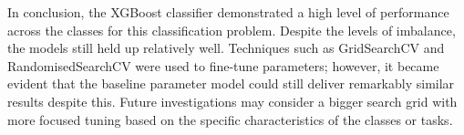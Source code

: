 \medskip
In conclusion, the XGBoost classifier demonstrated a high level of performance across the classes for this classification problem. Despite the levels of imbalance, the models still held up relatively well. Techniques such as GridSearchCV and RandomisedSearchCV were used to fine-tune parameters; however, it became evident that the baseline parameter model could still deliver remarkably similar results despite this. Future investigations may consider a bigger search grid with more focused tuning based on the specific characteristics of the classes or tasks.

%
%
